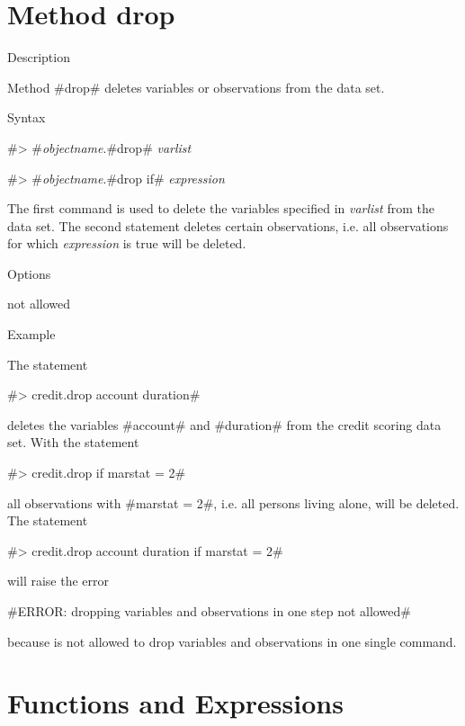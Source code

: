 \clearpage

\section{Method drop}
\label{drop}   

\begin{stanza}{Description}

Method #drop# deletes variables or observations from the data set.
\end{stanza}

\begin{stanza}{Syntax}

#> #{\em objectname}.#drop# {\em varlist}

#> #{\em objectname}.#drop if# {\em expression}

The first command is used to delete the variables specified in
{\em varlist} from the data set. The second statement deletes
certain observations, i.e. all observations for which {\em
expression} is true will be deleted.
\end{stanza}


\begin{stanza}{Options}

{not allowed}
\end{stanza}


\begin{stanza}{Example}

The statement

#> credit.drop account duration#

deletes the variables #account# and #duration# from the credit
scoring data set. With the statement

#> credit.drop if marstat = 2#

all observations with #marstat = 2#, i.e. all persons living
alone, will be deleted. The statement

#> credit.drop account duration if marstat = 2#

will raise the error

#ERROR: dropping variables and observations in one step not allowed#

because is not allowed to drop variables and observations in one
single command.
\end{stanza}

\clearpage

\section{Functions and Expressions}
\label{expression} 

